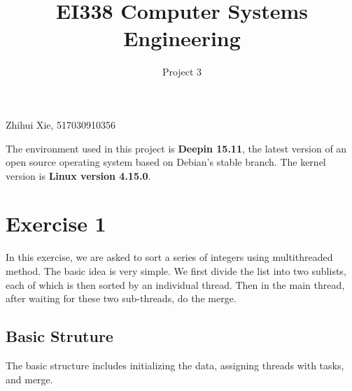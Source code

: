 \documentclass{article}
\title{EI338 Computer Systems Engineering}
\author{Project 3}
\begin{document}
\maketitle

\begin{center}
    Zhihui Xie, 517030910356
\end{center}

The environment used in this project is \textbf{Deepin 15.11}, the latest version of an open source operating system based on Debian's stable branch. The kernel version is \textbf{Linux version 4.15.0}.

\section*{Exercise 1}
In this exercise, we are asked to sort a series of integers using multithreaded method. The basic idea is very simple. We first divide the list into two sublists, each of which is then sorted by an individual thread. Then in the main thread, after waiting for these two sub-threads, do the merge.

\subsection*{Basic Struture}
The basic structure includes initializing the data, assigning threads with tasks, and merge.
\end{document}
